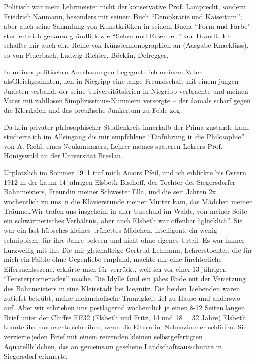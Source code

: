 Politisch war mein Lehrmeister nicht der konservative Prof. Lamprecht, sondern Friedrich Naumann, besonders mit seinem Buch \enquote{Demokratie und Kaisertum}; aber auch seine Sammlung von Kunstkritiken in seinem Buche \enquote{Form und Farbe} studierte ich genauso gründlich wie \enquote{Sehen und Erkennen} von Brandt. Ich schaffte mir auch eine Reihe von Künstermonographien an (Ausgabe Knackfüss), so von Feuerbach, Ludwig Richter, Böcklin, Defregger.

In meinen politischen Anschauungen begegnete ich meinem Vater als\linebreak Gleichgesinnten, den in Niegripp eine lange Freundschaft mit einem jungen Juristen verband, der seine Universitätsferien in Niegripp verbrachte und meinen Vater mit zahllosen Simplizissimus-Nummern versorgte -- der damals scharf gegen die Klerikalen und das preußische Junkertum zu Felde zog.

Da kein privater philosophischer Studienkreis innerhalb der Prima zustande kam, studierte ich im Alleingang die mir empfohlene \enquote{Einführung in die Philosophie} von A. Riehl, eines Neukantianers, Lehrer meines späteren Lehrers Prof. Hönigswald an der Universität Breslau. 

Urplötzlich im Sommer 1911 traf mich Amors Pfeil, und ich erblickte bis Ostern 1912 in der kaum 14-jährigen Elsbeth Bischoff, der Tochter des Siegersdorfer Bahnmeisters, Freundin meiner Schwester Ella, und die seit Jahren 2x wöchentlich zu uns in die Klavierstunde meiner Mutter kam, das Mädchen meiner Träume\dots Wir trafen uns insgeheim in aller Unschuld im Walde, von meiner Seite ein schwärmerisches Verhältnis, aber auch Elsbeth war offenbar \enquote{glücklich}. Sie war ein fast hübsches kleines brünettes Mädchen, intelligent, ein wenig schnippisch, für ihre Jahre belesen und nicht ohne eigenes Urteil. Es war immer kurzweilig mit ihr. Die mir gleichaltrige Gertrud Lehmann, Lehrerstochter, die für mich ein Faible ohne Gegenliebe empfand, machte mir eine fürchterliche Eifersuchtsszene, erklärte mich für verrückt, weil ich vor einer 13-jährigen \enquote{Fensterpromenaden} mache. Die Idylle fand ein jähes Ende mit der Versetzung des Bahnmeisters in eine Kleinstadt bei Liegnitz. Die beiden Liebenden waren zutiefst betrübt, meine melancholische Traurigkeit fiel zu Hause und anderswo auf. Aber wir schrieben uns postlagernd wöchentlich je einen 8-12 Seiten langen Brief unter der Chiffre EF32 (Elsbeth und Fritz, 14 und 18 = 32 Jahre) Elsbeth konnte ihn nur nachts schreiben, wenn die Eltern im Nebenzimmer schliefen. Sie verzierte jeden Brief mit einem reizenden kleinen selbstgefertigten Aquarellbildchen, das an gemeinsam gesehene Landschaftsausschnitte in Siegersdorf erinnerte.

